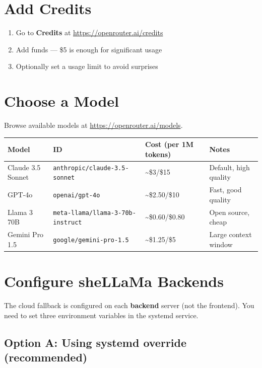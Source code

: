 \documentclass[11pt,a4paper]{article}
\begin{document}
\section{Add Credits}

\begin{enumerate}
  \item Go to \textbf{Credits} at \url{https://openrouter.ai/credits}
  \item Add funds --- \$5 is enough for significant usage
  \item Optionally set a usage limit to avoid surprises
\end{enumerate}

\section{Choose a Model}

Browse available models at \url{https://openrouter.ai/models}.

\begin{table}[h]
\centering
\begin{tabular}{llll}
\toprule
\textbf{Model} & \textbf{ID} & \textbf{Cost (per 1M tokens)} & \textbf{Notes} \\
\midrule
Claude 3.5 Sonnet & \texttt{anthropic/claude-3.5-sonnet} & \textasciitilde\$3/\$15 & Default, high quality \\
GPT-4o & \texttt{openai/gpt-4o} & \textasciitilde\$2.50/\$10 & Fast, good quality \\
Llama 3 70B & \texttt{meta-llama/llama-3-70b-instruct} & \textasciitilde\$0.60/\$0.80 & Open source, cheap \\
Gemini Pro 1.5 & \texttt{google/gemini-pro-1.5} & \textasciitilde\$1.25/\$5 & Large context window \\
\bottomrule
\end{tabular}
\end{table}

\section{Configure sheLLaMa Backends}

The cloud fallback is configured on each \textbf{backend} server (not the frontend). You need to set three environment variables in the systemd service.

\subsection{Option A: Using systemd override (recommended)}
\end{document}
